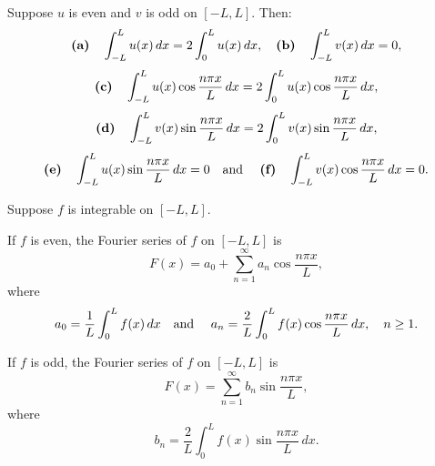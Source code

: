 \setcounter{theorem}{4}
\begin{theorem}
  \label{thmtype:11.2.5} Suppose $u$ is even and $v$ is odd on $[-L,L]$. Then:
  \[
    \mbox{{\bf (a)}\quad}\int_{-L}^{L}u(x)\,dx=2\int_{0}^{L}u(x)\,dx, \mbox{\quad {\bf (b)}\quad}\int_{-L}^{L}v(x)\,dx=0,
  \]
  \[
    \mbox{{\bf (c)}\quad}\int_{-L}^{L}u(x)\cos\frac{n\pi x}{L}\,dx=2\int_{0}^{L}u(x)\cos\frac{n\pi x}{L}\,dx,
  \]
  \[
    \mbox{{\bf (d)}\quad}\int_{-L}^{L}v(x)\sin\frac{n\pi x}{L}\,dx= 2\int_{0}^{L}v(x)\sin\frac{n\pi x}{L}\,dx,
  \]
  \[
    \mbox{{\bf (e)}\quad}\int_{-L}^{L}u(x)\sin\frac{n\pi x}{L}\,dx=0 \mbox{\quad and \quad {\bf (f)}\quad}\int_{-L}^{L}v(x)\cos\frac{n\pi x}{L}\,dx=0.
  \]
\end{theorem}

\setcounter{theorem}{5}
\begin{theorem}
  \label{thmtype:11.2.6} Suppose $f$ is integrable on $[-L,L]$.
  \begin{alist}
    \item %
    If $f$ is even, the Fourier series of $f$ on $[-L,L]$ is
    \[
      F(x)=a_{0}+\sum_{n=1}^{\infty}a_{n}\cos\frac{n\pi x}{L},
    \]
    where
    \[
      a_{0}=\frac{1}{L}\int_{0}^{L}f(x)\,dx\mbox{\quad and \quad}a_{n}=\frac{2}{L}\int_{0}^{L}f(x)\cos\frac{n\pi x}{L}\,dx,\quad n\ge1.
    \]

    \item %
    If $f$ is odd, the Fourier series of $f$ on $[-L,L]$ is
    \[
      F(x)=\sum_{n=1}^{\infty}b_{n}\sin\frac{n\pi x}{L},
    \]
    where
    \[
      b_{n}=\frac{2}{L}\int_{0}^{L}f(x)\sin\frac{n\pi x}{L}\,dx.
    \]
  \end{alist}
\end{theorem}

